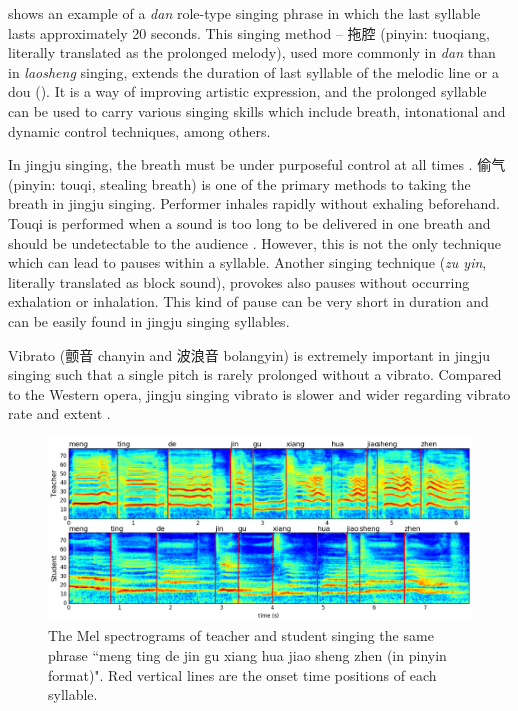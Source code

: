  shows an example of a \textit{dan} role-type singing phrase in which the last syllable lasts approximately 20 seconds. This singing method -- 拖腔 (pinyin: tuoqiang, literally translated as the prolonged melody), used more commonly in \textit{dan} than in \textit{laosheng} singing, extends the duration of last syllable of the melodic line or a dou (). It is a way of improving artistic expression, and the prolonged syllable can be used to carry various singing skills which include breath, intonational and dynamic control techniques, among others. 

In jingju singing, the breath must be under purposeful control at all times \cite{Wichmann1991a}. 偷气 (pinyin: touqi, stealing breath) is one of the primary methods to taking the breath in jingju singing. Performer inhales rapidly without exhaling beforehand. Touqi is performed when a sound is too long to be delivered in one breath and should be undetectable to the audience \cite{Wichmann1991a}. However, this is not the only technique which can lead to pauses within a syllable. Another singing technique (\textit{zu yin}, literally translated as block sound), provokes also pauses without occurring exhalation or inhalation. This kind of pause can be very short in duration and can be easily found in jingju singing syllables. 

Vibrato (颤音 chanyin and 波浪音 bolangyin) is extremely important in jingju singing such that a single pitch is rarely prolonged without a vibrato. Compared to the Western opera, jingju singing vibrato is slower and wider regarding vibrato rate and extent \cite{Yang2015a}.  

\begin{figure}[ht!]
\includegraphics[width=\textwidth]{figs/spectro_vis/ch3_overall_qua.png}
\caption{The Mel spectrograms of teacher and student singing the same phrase ``meng ting de jin gu xiang hua jiao sheng zhen (in pinyin format)". Red vertical lines are the onset time positions of each syllable.}
\label{fig:overall_qua}
\end{figure}



